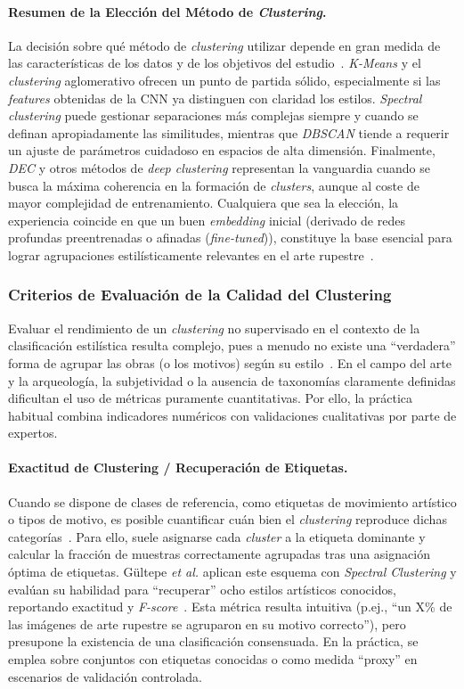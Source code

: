 \paragraph{Resumen de la Elección del Método de \textit{Clustering}.}
La decisión sobre qué método de \textit{clustering} utilizar depende en gran medida de las características de los datos y de los objetivos del estudio~\cite{dangeti2024}.
\textit{K-Means} y el \textit{clustering} aglomerativo ofrecen un punto de partida sólido, especialmente si las \textit{features} obtenidas de la CNN ya distinguen con claridad los estilos.
\textit{Spectral clustering} puede gestionar separaciones más complejas siempre y cuando se definan apropiadamente las similitudes, mientras que \textit{DBSCAN} tiende a requerir un ajuste de parámetros cuidadoso en espacios de alta dimensión.
Finalmente, \textit{DEC} y otros métodos de \textit{deep clustering} representan la vanguardia cuando se busca la máxima coherencia en la formación de \textit{clusters}, aunque al coste de mayor complejidad de entrenamiento.
Cualquiera que sea la elección, la experiencia coincide en que un buen \textit{embedding} inicial (derivado de redes profundas preentrenadas o afinadas (\textit{fine-tuned})), constituye la base esencial para lograr agrupaciones estilísticamente relevantes en el arte rupestre~\cite{guerin2018,gultepe2018,dangeti2024}.

\subsubsection{Criterios de Evaluación de la Calidad del Clustering }
Evaluar el rendimiento de un \textit{clustering} no supervisado en el contexto de la clasificación estilística resulta complejo, pues a menudo no existe una “verdadera” forma de agrupar las obras (o los motivos) según su estilo~\cite{dangeti2024}.
En el campo del arte y la arqueología, la subjetividad o la ausencia de taxonomías claramente definidas dificultan el uso de métricas puramente cuantitativas.
Por ello, la práctica habitual combina indicadores numéricos con validaciones cualitativas por parte de expertos.

\paragraph{Exactitud de Clustering / Recuperación de Etiquetas.}
Cuando se dispone de clases de referencia, como etiquetas de movimiento artístico o tipos de motivo, es posible cuantificar cuán bien el \textit{clustering} reproduce dichas categorías~\cite{guerin2018}.
Para ello, suele asignarse cada \textit{cluster} a la etiqueta dominante y calcular la fracción de muestras correctamente agrupadas tras una asignación óptima de etiquetas.
Gültepe \textit{et al.} aplican este esquema con \textit{Spectral Clustering} y evalúan su habilidad para “recuperar” ocho estilos artísticos conocidos, reportando exactitud y \textit{F-score}~\cite{gultepe2018}.
Esta métrica resulta intuitiva (p.ej., “un X\% de las imágenes de arte rupestre se agruparon en su motivo correcto”), pero presupone la existencia de una clasificación consensuada.
En la práctica, se emplea sobre conjuntos con etiquetas conocidas o como medida “proxy” en escenarios de validación controlada.

